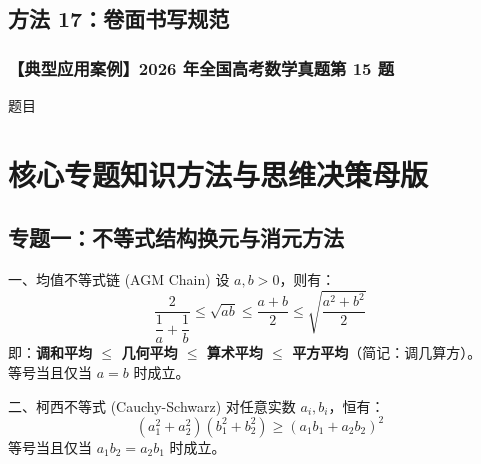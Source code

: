 \documentclass[11pt,a4paper]{ctexart}
\begin{document}
\subsection{方法 17：卷面书写规范}

\subsubsection*{【典型应用案例】2026 年全国高考数学真题第 15 题}
\begin{lessonbriefbox}{题目}
\end{lessonbriefbox}

\qSolidPrismDistanceSolution

\newpage

\section{核心专题知识方法与思维决策母版}

\subsection{专题一：不等式结构换元与消元方法}

\begin{theorembox}{一、均值不等式链 (AGM Chain)}
设 $a, b > 0$，则有：
\[
  \frac{2}{\dfrac{1}{a}+\dfrac{1}{b}} \leqslant \sqrt{ab} \leqslant \frac{a+b}{2} \leqslant \sqrt{\frac{a^2+b^2}{2}}
\]
即：\textbf{调和平均 $\leqslant$ 几何平均 $\leqslant$ 算术平均 $\leqslant$ 平方平均}（简记：调几算方）。\\
等号当且仅当 $a = b$ 时成立。
\end{theorembox}

\begin{theorembox}{二、柯西不等式 (Cauchy-Schwarz)}
对任意实数 $a_i, b_i$，恒有：
\[
  (a_1^2 + a_2^2)(b_1^2 + b_2^2) \geqslant (a_1b_1 + a_2b_2)^2
\]
等号当且仅当 $a_1b_2 = a_2b_1$ 时成立。
\end{theorembox}
\end{document}
